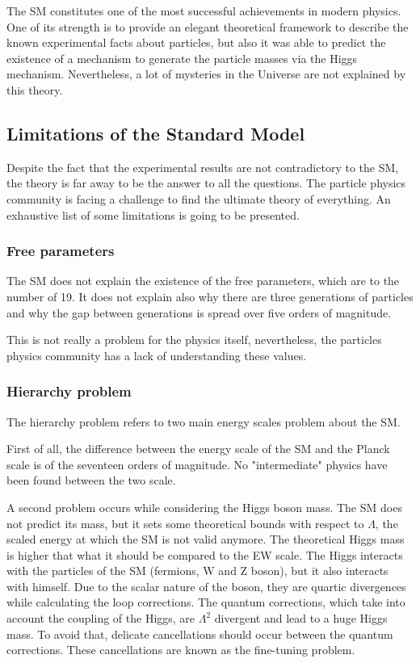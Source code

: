   The \gls{SM} constitutes one of the most successful achievements in modern physics.
  One of its strength is to provide an elegant theoretical framework to describe the known experimental facts about particles, but also it was able to predict 
  the existence of a mechanism to generate the particle masses via the Higgs mechanism.
  Nevertheless, a lot of mysteries in the Universe are not explained by this theory. 
  
  \subsection{Limitations of the Standard Model}

  Despite the fact that the experimental results are not contradictory to the \gls{SM}, the theory is far away to be the answer to all the questions.
  The particle physics community is facing a challenge to find the ultimate theory of everything.
  An exhaustive list of some limitations is going to be presented.

    \subsubsection{Free parameters}

    The \gls{SM} does not explain the existence of the free parameters, which are to the number of 19.
    It does not explain also why there are three generations of particles and why the gap between generations is spread over five orders of magnitude.

    This is not really a problem for the physics itself, nevertheless, the particles physics community has a lack of understanding these values.
  
    \subsubsection{Hierarchy problem}

    The hierarchy problem refers to two main energy scales problem about the \gls{SM}.

    First of all, the difference between the energy scale of the \gls{SM} and the Planck scale is of the seventeen orders of magnitude.
    No "intermediate" physics have been found between the two scale.

    A second problem occurs while considering the Higgs boson mass.
    The \gls{SM} does not predict its mass, but it sets some theoretical bounds with respect to $\Lambda$, the scaled energy at which the \gls{SM} is not valid anymore.
    The theoretical Higgs mass is higher that what it should be compared to the EW scale.
    The Higgs interacts with the particles of the \gls{SM} (fermions, W and Z boson), but it also interacts with himself.
    Due to the scalar nature of the boson, they are quartic divergences while calculating the loop corrections.
    The quantum corrections, which take into account the coupling of the Higgs, are $\Lambda^2$ divergent and lead to a huge Higgs mass.
    To avoid that, delicate cancellations should occur between the quantum corrections.
    These cancellations are known as the fine-tuning problem. 
    
